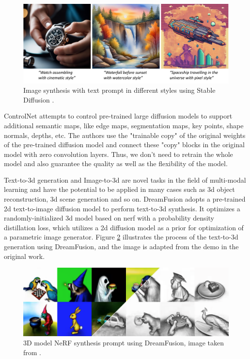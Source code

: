 \documentclass[12pt,DIV14,BCOR12mm,a4paper,footinclude=false,headinclude,parskip=half-,twoside,openright,cleardoublepage=empty,toc=index,bibliography=totoc,listof=totoc]{scrreprt}
\numberwithin{equation}{chapter}
\begin{document}
\begin{figure}[h]
	\centering
	\includegraphics[width=1.0\textwidth]{img/sd.pdf}
	\caption{Image synthesis with text prompt in different styles using Stable Diffusion \cite{rombach2022highresolution}.}
	\label{img:sd}
\end{figure}

ControlNet \cite{zhang2023adding} attempts to control pre-trained large diffusion models to support additional semantic maps, like edge maps, segmentation maps, key points, shape normals, depths, etc. The authors use the "trainable copy" of the original weights of the pre-trained diffusion model and connect these "copy" blocks in the original model with zero convolution layers. Thus, we don't need to retrain the whole model and also guarantee the quality as well as the flexibility of the model.

Text-to-\gls{3d} generation and Image-to-\gls{3d} are novel tasks in the field of multi-modal learning and have the potential to be applied in many cases such as \gls{3d} object reconstruction, \gls{3d} scene generation and so on. DreamFusion \cite{poole2022dreamfusion} adopts a pre-trained \gls{2d} text-to-image diffusion model to perform text-to-\gls{3d} synthesis. It optimizes a randomly-initialized \gls{3d} model based on \gls{nerf} with a probability density distillation loss, which utilizes a \gls{2d} diffusion model as a prior for optimization of a parametric image generator. Figure \ref{img:df} illustrates the process of the text-to-\gls{3d} generation using DreamFusion, and the image is adapted from the demo in the original work.

\begin{figure}[h]
	\centering
	\includegraphics[width=1.0\textwidth]{img/df.png}
	\caption{3D model NeRF synthesis prompt using DreamFusion, image taken from \cite{poole2022dreamfusion}.}
	\label{img:df}
\end{figure}
\end{document}
